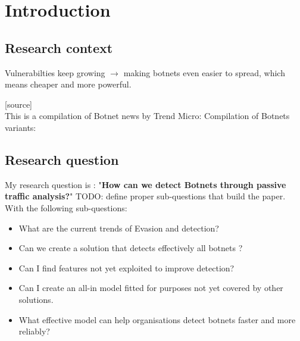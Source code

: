 
\chapter{Introduction} %

\label{Introduction} %


\newcommand{\keyword}[1]{\textbf{#1}}
\newcommand{\tabhead}[1]{\textbf{#1}}
\newcommand{\code}[1]{\texttt{#1}}
\newcommand{\file}[1]{\texttt{\bfseries#1}}
\newcommand{\option}[1]{\texttt{\itshape#1}}

\section{Research context}
Vulnerabilties keep growing $\rightarrow$ making botnets even easier to spread, which means cheaper and more powerful.

[source]\\
This is a compilation of Botnet news by Trend Micro: %
Compilation of Botnets variants: %
\section{Research question}
My research question is : "\textbf{How can we detect Botnets through passive traffic analysis?}"
TODO: define proper sub-questions that build the paper.
With the following sub-questions:
\begin{itemize}
\item What are the current trends of Evasion and detection?
\item Can we create a solution that detects effectively all botnets ?
\item Can I find features not yet exploited to improve detection?
\item Can I create an all-in model fitted for purposes not yet covered by other solutions.
\item What effective model can help organisations detect botnets faster and more reliably?
\end{itemize}
